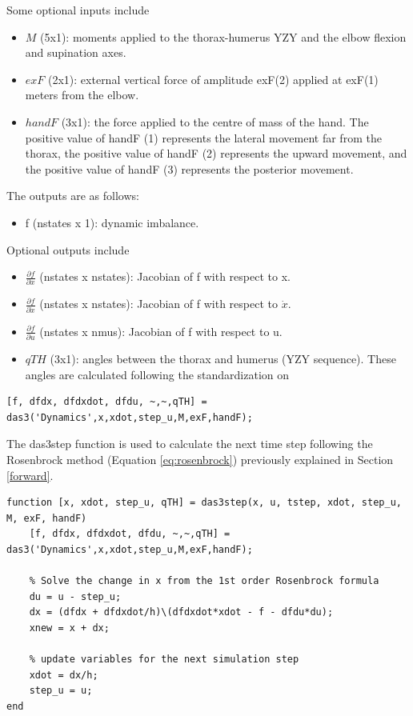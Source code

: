 Some optional inputs include
\begin{itemize}
    \item $M$ (5x1): moments applied to the thorax-humerus YZY and the elbow flexion and supination axes.
    \item $exF$ (2x1): external vertical force of amplitude exF(2) applied at exF(1) meters from the elbow.
    \item $handF$ (3x1): the force applied to the centre of mass of the hand. The positive value of handF (1) represents the lateral movement far from the thorax, the positive value of handF (2) represents the upward movement, and the positive value of handF (3) represents the posterior movement.
\end{itemize}


The outputs are as follows:

\begin{itemize}
    \item f (nstates x 1): dynamic imbalance.
\end{itemize}

Optional outputs include
\begin{itemize}
    \item $\frac{\partial f}{\partial x}$ (nstates x nstates): Jacobian of f with respect to x.
    \item $\frac{\partial f}{\partial \dot{x}}$ (nstates x nstates): Jacobian of f with respect to $\dot{x}$.
    \item $\frac{\partial f}{\partial u}$ (nstates x nmus): Jacobian of f with respect to u.
    \item $qTH$ (3x1): angles between the thorax and humerus (YZY sequence). These angles are calculated following the standardization on \cite{ISB}
\end{itemize}
\begin{lstlisting}[style=Matlab-editor]
[f, dfdx, dfdxdot, dfdu, ~,~,qTH] = das3('Dynamics',x,xdot,step_u,M,exF,handF);
\end{lstlisting}

The das3step function is used to calculate the next time step following the Rosenbrock method (Equation \ref{eq:rosenbrock}) previously explained in Section \ref{forward}.

\begin{lstlisting}[style=Matlab-editor]
function [x, xdot, step_u, qTH] = das3step(x, u, tstep, xdot, step_u, M, exF, handF)
    [f, dfdx, dfdxdot, dfdu, ~,~,qTH] = das3('Dynamics',x,xdot,step_u,M,exF,handF);
    
	% Solve the change in x from the 1st order Rosenbrock formula
	du = u - step_u;
	dx = (dfdx + dfdxdot/h)\(dfdxdot*xdot - f - dfdu*du);
	xnew = x + dx;
	
	% update variables for the next simulation step
	xdot = dx/h;
	step_u = u;
end
\end{lstlisting}\label{matlab:das3step}


